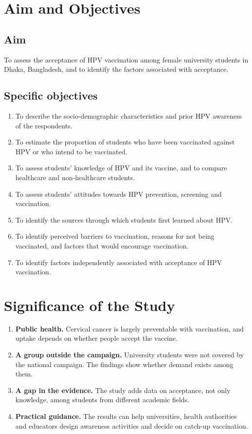 \section{Aim and Objectives}
\subsection*{Aim}
To assess the acceptance of HPV vaccination among female university students in Dhaka, Bangladesh, and to identify the factors associated with acceptance.

\subsection*{Specific objectives}
\begin{enumerate}[leftmargin=*,itemsep=0pt]
\item To describe the socio-demographic characteristics and prior HPV awareness of the respondents.
\item To estimate the proportion of students who have been vaccinated against HPV or who intend to be vaccinated.
\item To assess students' knowledge of HPV and its vaccine, and to compare healthcare and non-healthcare students.
\item To assess students' attitudes towards HPV prevention, screening and vaccination.
\item To identify the sources through which students first learned about HPV.
\item To identify perceived barriers to vaccination, reasons for not being vaccinated, and factors that would encourage vaccination.
\item To identify factors independently associated with acceptance of HPV vaccination.
\end{enumerate}

\section{Significance of the Study}
\begin{enumerate}[leftmargin=*,itemsep=2pt]
\item \textbf{Public health.} Cervical cancer is largely preventable with vaccination, and uptake depends on whether people accept the vaccine.
\item \textbf{A group outside the campaign.} University students were not covered by the national campaign. The findings show whether demand exists among them.
\item \textbf{A gap in the evidence.} The study adds data on acceptance, not only knowledge, among students from different academic fields.
\item \textbf{Practical guidance.} The results can help universities, health authorities and educators design awareness activities and decide on catch-up vaccination.
\end{enumerate}

